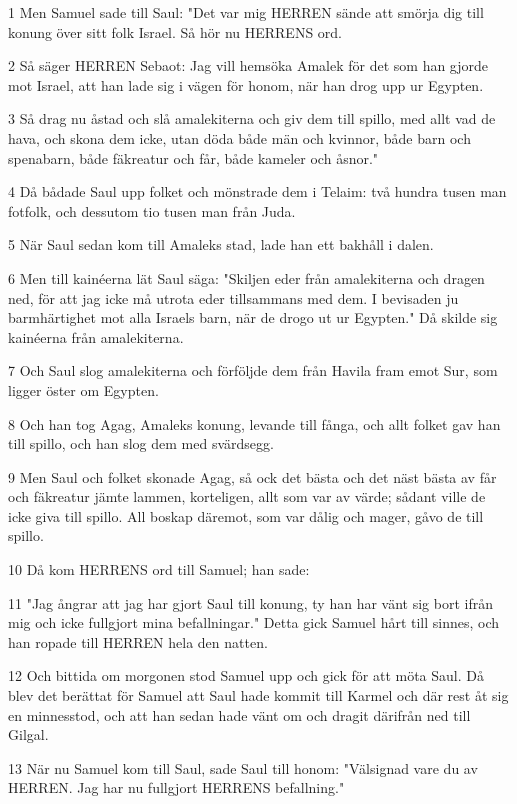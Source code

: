 \par 1 Men Samuel sade till Saul: "Det var mig HERREN sände att smörja dig till konung över sitt folk Israel. Så hör nu HERRENS ord.
\par 2 Så säger HERREN Sebaot: Jag vill hemsöka Amalek för det som han gjorde mot Israel, att han lade sig i vägen för honom, när han drog upp ur Egypten.
\par 3 Så drag nu åstad och slå amalekiterna och giv dem till spillo, med allt vad de hava, och skona dem icke, utan döda både män och kvinnor, både barn och spenabarn, både fäkreatur och får, både kameler och åsnor."
\par 4 Då bådade Saul upp folket och mönstrade dem i Telaim: två hundra tusen man fotfolk, och dessutom tio tusen man från Juda.
\par 5 När Saul sedan kom till Amaleks stad, lade han ett bakhåll i dalen.
\par 6 Men till kainéerna lät Saul säga: "Skiljen eder från amalekiterna och dragen ned, för att jag icke må utrota eder tillsammans med dem. I bevisaden ju barmhärtighet mot alla Israels barn, när de drogo ut ur Egypten." Då skilde sig kainéerna från amalekiterna.
\par 7 Och Saul slog amalekiterna och förföljde dem från Havila fram emot Sur, som ligger öster om Egypten.
\par 8 Och han tog Agag, Amaleks konung, levande till fånga, och allt folket gav han till spillo, och han slog dem med svärdsegg.
\par 9 Men Saul och folket skonade Agag, så ock det bästa och det näst bästa av får och fäkreatur jämte lammen, korteligen, allt som var av värde; sådant ville de icke giva till spillo. All boskap däremot, som var dålig och mager, gåvo de till spillo.
\par 10 Då kom HERRENS ord till Samuel; han sade:
\par 11 "Jag ångrar att jag har gjort Saul till konung, ty han har vänt sig bort ifrån mig och icke fullgjort mina befallningar." Detta gick Samuel hårt till sinnes, och han ropade till HERREN hela den natten.
\par 12 Och bittida om morgonen stod Samuel upp och gick för att möta Saul. Då blev det berättat för Samuel att Saul hade kommit till Karmel och där rest åt sig en minnesstod, och att han sedan hade vänt om och dragit därifrån ned till Gilgal.
\par 13 När nu Samuel kom till Saul, sade Saul till honom: "Välsignad vare du av HERREN. Jag har nu fullgjort HERRENS befallning."
